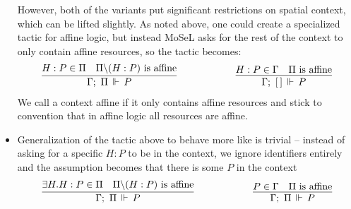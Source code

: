 \begin{itemize}
  However, both of the variants put significant restrictions on spatial context, which can be lifted slightly.
  As noted above, one could create a specialized tactic for affine logic, but instead MoSeL asks for the rest of the context to only contain affine resources, so the tactic becomes:
  \begin{align*}
      \infer%
        {\entailsD P}
        {H : P \in \SpatD &
         \SpatD \backslash (H : P) \text{ is affine}}
    & \hspace{5em}
    & \infer%
        {\entails {\IntuD} {[\,]} P}
        {H : P \in \IntuD &
         \SpatD \text{ is affine}}
  \end{align*}
  We call a context affine if it only contains affine resources and stick to convention that in affine logic all resources are affine.
\item Generalization of the tactic above to behave more like  is trivial -- instead of asking for a specific \(H : P\) to be in the context, we ignore identifiers entirely and the assumption becomes that there is some \(P\) in the context
  \begin{align*}
      \infer%
        {\entailsD P}
        {\exists H. H : P \in \SpatD &
         \SpatD \backslash (H : P) \text{ is affine}}
    & \hspace{5em}
    & \infer%
        {\entailsD P}
        {P \in \IntuD &
         \SpatD \text{ is affine}}
  \end{align*}
\end{itemize}

